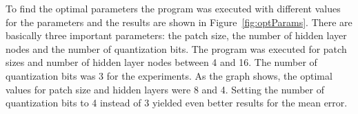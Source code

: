 To find the optimal parameters the program was executed with different values for the parameters and the results are shown in Figure~\ref{fig:optParams}. There are basically three important parameters: the patch size, the number of hidden layer nodes and the number of quantization bits. The program was executed for patch sizes and number of hidden layer nodes between 4 and 16. The number of quantization bits was 3 for the experiments. As the graph shows, the optimal values for patch size and hidden layers were 8 and 4. Setting the number of quantization bits to 4 instead of 3 yielded even better results for the mean error.









